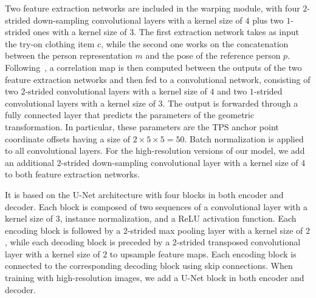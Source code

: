 \begin{table}[t]
\centering
\footnotesize
\caption{Number of train and test pairs for each category of the Dress Code dataset.}
\label{tab:stats}
\vspace{-0.4cm}
\end{table}

 Two feature extraction networks are included in the warping module, with four $2$-strided down-sampling convolutional layers with a kernel size of $4$ plus two $1$-strided ones with a kernel size of $3$. The first extraction network takes as input the try-on clothing item $c$, while the second one works on the concatenation between the person representation $m$ and the pose of the reference person $p$. Following~\cite{wang2018toward}, a correlation map is then computed between the outputs of the two feature extraction networks and then fed to a convolutional network, consisting of two $2$-strided convolutional layers with a kernel size of $4$ and two $1$-strided convolutional layers with a kernel size of $3$. The output is forwarded through a fully connected layer that predicts the parameters of the geometric transformation. In particular, these parameters are the TPS anchor point coordinate offsets having a size of $2\times5\times5 = 50$. Batch normalization is applied to all convolutional layers. For the high-resolution versions of our model, we add an additional $2$-strided down-sampling convolutional layer with a kernel size of $4$ to both feature extraction networks.

It is based on the U-Net architecture with four blocks in both encoder and decoder. Each block is composed of two sequences of a convolutional layer with a kernel size of $3$, instance normalization, and a ReLU activation function. Each encoding block is followed by a $2$-strided max pooling layer with a kernel size of $2$, while each decoding block is preceded by a 2-strided transposed convolutional layer with a kernel size of $2$ to upsample feature maps. Each encoding block is connected to the corresponding decoding block using skip connections. When training with high-resolution images, we add a U-Net block in both encoder and decoder.


